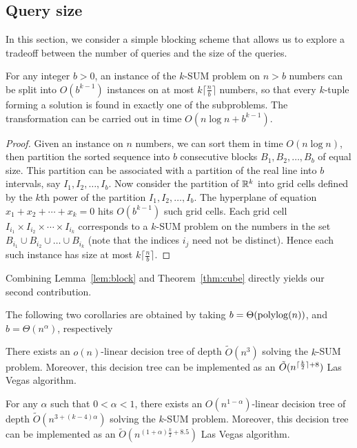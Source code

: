 \subsection{Query size}
\label{paper:ksum-algorithm:contrib:query-size}

In this section, we consider a simple blocking scheme that allows us to explore
a tradeoff between the number of queries and the size of the queries.

\begin{lemma}
\label{lem:block}
For any integer $b>0$, an instance of the \(k\)-SUM problem on $n>b$ numbers can be split into
$O(b^{k-1})$ instances on at most $k\lceil \frac{n}{b}\rceil$ numbers, so that every $k$-tuple
forming a solution is found in exactly one of the subproblems.
The transformation can be carried out in time $O(n\log n + b^{k-1})$.
\end{lemma}
\begin{proof}
Given an instance on $n$ numbers, we can sort them in time $O(n\log n)$, then partition
the sorted sequence into \(b\) consecutive blocks \(B_1, B_2,\ldots ,B_b\) of equal size.
This partition can be associated with a partition of the real line
into $b$ intervals, say $I_1, I_2,\ldots ,I_b$. Now consider the partition of $\mathbb{R}^k$
into grid cells defined by the $k$th power of the partition $I_1, I_2,\ldots ,I_b$. The
hyperplane of equation $x_1 + x_2 +\cdots +x_k = 0$ hits $O(b^{k-1})$ such grid cells.
Each grid cell $I_{i_1}\times I_{i_2}\times \cdots \times I_{i_k}$ corresponds to a
\(k\)-SUM problem on the numbers in the set $B_{i_1}\cup B_{i_2}\cup \ldots \cup B_{i_k}$ (note that
the indices $i_j$ need not be distinct). Hence each such instance has size at most $k\lceil \frac{n}{b}\rceil$.
\end{proof}

Combining Lemma~\ref{lem:block} and Theorem~\ref{thm:cube} directly yields our
second contribution.
%
\TheoremKSUMQuerySize*

The following two corollaries are obtained by taking
$b=\Theta(\operatorname{polylog}(n))$, and $b=\Theta(n^{\alpha})$, respectively
\begin{corollary}\label{cor:logn}
There exists an $o(n)$-linear decision tree of
depth $\tilde{O}(n^3)$ solving the \(k\)-SUM problem.
Moreover, this decision tree can be implemented as an
$\tilde{O}(n^{\lceil\frac{k}{2}\rceil+8})$ Las Vegas algorithm.
\end{corollary}
\begin{corollary}\label{cor:ne}
For any $\alpha$ such that $0<\alpha<1$,
there exists an $O(n^{1-\alpha})$-linear decision tree of
depth $\tilde{O} (n^{3+(k-4)\alpha})$ solving the \(k\)-SUM problem.
Moreover, this decision tree can be implemented as an
$\tilde{O}(n^{(1+\alpha)\frac{k}{2} + 8.5})$
Las Vegas algorithm.
\end{corollary}

